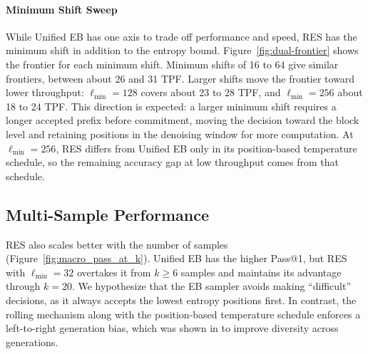 \paragraph{Minimum Shift Sweep}
While Unified EB has one axis to trade off performance and speed, RES has the minimum shift in addition to the entropy bound.
Figure~\ref{fig:dual-frontier} shows the frontier for each minimum shift.
Minimum shifts of 16 to 64 give similar frontiers, between about 26 and 31 TPF.
Larger shifts move the frontier toward lower throughput: $\ell_{\min}=128$ covers about 23 to 28 TPF, and $\ell_{\min}=256$ about 18 to 24 TPF.
This direction is expected: a larger minimum shift requires a longer accepted prefix before commitment, moving the decision toward the block level and retaining positions in the denoising window for more computation.
At $\ell_{\min} = 256$, RES differs from Unified EB only in its position-based temperature schedule, so the remaining accuracy gap at low throughput comes from that schedule.

\subsection{Multi-Sample Performance}
RES also scales better with the number of samples (Figure~\ref{fig:macro_pass_at_k}).
Unified EB has the higher Pass@1, but RES with $\ell_{\min}=32$ overtakes it from $k \ge 6$ samples and maintains its advantage through $k=20$.
We hypothesize that the EB sampler avoids making ``difficult'' decisions, as it always accepts the lowest entropy positions first.
In contrast, the rolling mechanism along with the position-based temperature schedule enforces a left-to-right generation bias, which was shown in \citet{ni2026flexibility} to improve diversity across generations.
